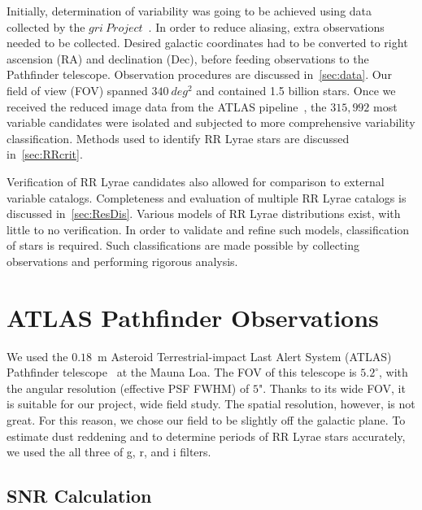 \documentclass[aps,prb,twocolumn,superscriptaddress]{revtex4-1}
\begin{document}
Initially, determination of variability was going to be achieved using data collected by the $gri~Project$~\cite{gri}.  %
In order to reduce aliasing, extra observations needed to be collected.  Desired galactic coordinates had to 
be converted to right ascension (RA) and declination (Dec), before feeding observations to the Pathfinder telescope.
Observation procedures are discussed in~\cref{sec:data}.
Our field of view (FOV) spanned $340~deg^{2}$ and contained 1.5 billion stars.  Once we received the reduced 
image data from the ATLAS pipeline~\cite{gri}, the $315,992$ most variable candidates were isolated and subjected to 
more comprehensive variability classification.  Methods used to identify RR Lyrae stars are discussed in~\cref{sec:RRcrit}.

\indent Verification of RR Lyrae candidates also allowed for comparison to external 
variable catalogs.  Completeness and evaluation of multiple RR Lyrae catalogs 
is discussed in~\cref{sec:ResDis}.  Various models of RR Lyrae distributions 
exist, with little to no verification.  In order to validate and refine such 
models, classification of stars is required.   Such classifications are made 
possible by collecting observations and performing rigorous analysis.
  


\section{ATLAS Pathfinder Observations}


We used the $0.18$~m Asteroid Terrestrial-impact Last Alert System (ATLAS) Pathfinder telescope~\citep{fallingstar} at the Mauna Loa. The FOV of this telescope is $5.2^{\circ}$, with the angular resolution (effective PSF FWHM) of $5$". Thanks to its wide FOV, it is suitable for our project, wide field study. The spatial resolution, however, is not great. For this reason, we chose our field to be slightly off the galactic plane. To estimate dust reddening and to determine periods of RR Lyrae stars accurately, we used the all three of g, r, and i filters.



\subsection{SNR Calculation}\label{sec:SNR}
\end{document}
